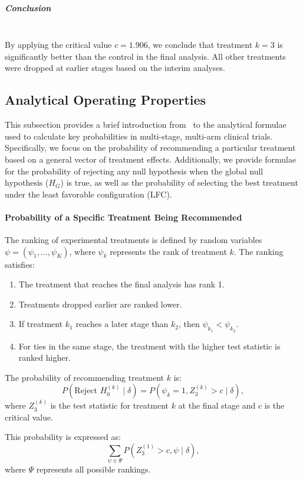 \documentclass[11pt, a4paper]{article}\usepackage[]{graphicx}\usepackage[]{xcolor}
\begin{document}
\subparagraph{Conclusion}\\
By applying the critical value \( c = 1.906 \), we conclude that treatment \( k = 3 \) is significantly better than the control in the final analysis. All other treatments were dropped at earlier stages based on the interim analyses.



\subsection{Analytical Operating Properties}
This subsection provides a brief introduction from~\cite{Wason2017DropTheLosers} to the analytical formulae used to calculate key probabilities in multi-stage, multi-arm clinical trials. Specifically, we focus on the probability of recommending a particular treatment based on a general vector of treatment effects. Additionally, we provide formulae for the probability of rejecting any null hypothesis when the global null hypothesis ($H_G$) is true, as well as the probability of selecting the best treatment under the least favorable configuration (LFC).


\paragraph{Probability of a Specific Treatment Being Recommended}
The ranking of experimental treatments is defined by random variables $\psi = (\psi_1, \ldots, \psi_K)$, where $\psi_k$ represents the rank of treatment $k$. The ranking satisfies:
\begin{enumerate}
    \item The treatment that reaches the final analysis has rank 1.
    \item Treatments dropped earlier are ranked lower.
    \item If treatment $k_1$ reaches a later stage than $k_2$, then $\psi_{k_1} < \psi_{k_2}$.
    \item For ties in the same stage, the treatment with the higher test statistic is ranked higher.
\end{enumerate}

The probability of recommending treatment $k$ is:
\[
P\left(\text{Reject } H_0^{(k)} \mid \delta\right) = P\left(\psi_k = 1, Z_3^{(k)} > c \mid \delta\right),
\]
where $Z_3^{(k)}$ is the test statistic for treatment $k$ at the final stage and $c$ is the critical value.

This probability is expressed as:
\[
\sum_{\psi \in \Psi} P(Z_3^{(1)} > c, \psi \mid \delta),
\]
where $\Psi$ represents all possible rankings.
\end{document}
